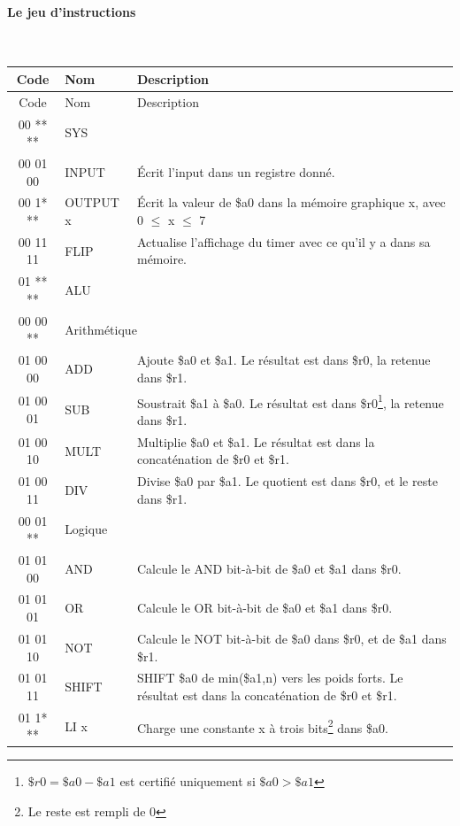 \documentclass{article}
\begin{document}
\paragraph{Le jeu d'instructions}~
\begin{savenotes}
\begin{longtable}{|c|l|l|}
  
  \hline
  Code & Nom & Description \\
  \endfirsthead
  \hline
  Code & Nom & Description \\
  \hline\hline
  \endhead


  \hline\hline
  00 ** ** & \multicolumn{2}{|l|}{SYS} \\
  \hline
  00 01 00 & INPUT    & \'Ecrit l'input dans un registre donné. \\
  00 1* ** & OUTPUT x & \'Ecrit la valeur de \$a0 dans la mémoire graphique x, avec 0 $\leq$ x $\leq$ 7 \\
  00 11 11 & FLIP     & Actualise l'affichage du timer avec ce qu'il y a dans sa mémoire. \\
  
  \hline\hline
  01 ** ** & \multicolumn{2}{|l|}{ALU} \\
  \hline
  00 00 ** & \multicolumn{2}{|l|}{Arithmétique} \\
  \hline
  01 00 00 & ADD   & Ajoute \$a0 et \$a1. Le résultat est dans \$r0, la retenue dans \$r1. \\
  01 00 01 & SUB   & Soustrait \$a1 à \$a0. Le résultat est dans \$r0\footnote{$\$r0=\$a0-\$a1$ est certifié uniquement si $\$a0>\$a1$}, la retenue dans \$r1. \\
  01 00 10 & MULT  & Multiplie \$a0 et \$a1. Le résultat est dans la concaténation de \$r0 et \$r1.\\
  01 00 11 & DIV   & Divise \$a0 par \$a1. Le quotient est dans \$r0, et le reste dans \$r1. \\
  \hline
  00 01 ** & \multicolumn{2}{|l|}{Logique} \\
  \hline
  01 01 00 & AND   & Calcule le AND bit-à-bit de \$a0 et \$a1 dans \$r0. \\
  01 01 01 & OR    & Calcule le OR bit-à-bit de \$a0 et \$a1 dans \$r0. \\
  01 01 10 & NOT   & Calcule le NOT bit-à-bit de \$a0 dans \$r0, et de \$a1 dans \$r1. \\
  01 01 11 & SHIFT & SHIFT \$a0 de min(\$a1,n) vers les poids forts. Le résultat est dans la concaténation de \$r0 et \$r1.\\
  \hline
  01 1* ** & LI x  & Charge une constante x à trois bits\footnote{Le reste est rempli de 0} dans \$a0. \\
  

\end{longtable}
\end{savenotes}
\end{document}
